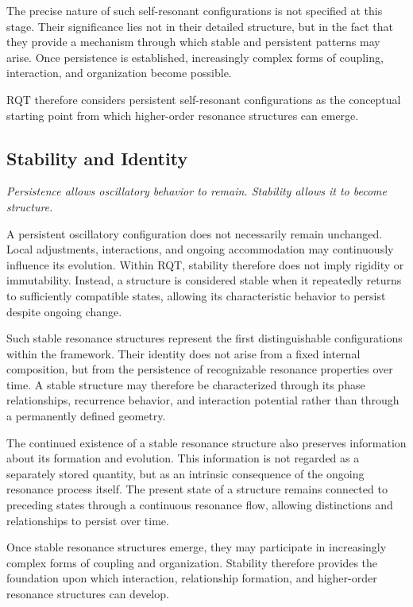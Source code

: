 \documentclass[11pt,a4paper]{article}
\begin{document}
The precise nature of such self-resonant configurations is not specified at this stage. Their significance lies not in their detailed structure, but in the fact that they provide a mechanism through which stable and persistent patterns may arise. Once persistence is established, increasingly complex forms of coupling, interaction, and organization become possible.

RQT therefore considers persistent self-resonant configurations as the conceptual starting point from which higher-order resonance structures can emerge.


\subsection{Stability and Identity}

\emph{Persistence allows oscillatory behavior to remain. Stability allows it to become structure.}

A persistent oscillatory configuration does not necessarily remain unchanged. Local adjustments, interactions, and ongoing accommodation may continuously influence its evolution. Within RQT, stability therefore does not imply rigidity or immutability. Instead, a structure is considered stable when it repeatedly returns to sufficiently compatible states, allowing its characteristic behavior to persist despite ongoing change.

Such stable resonance structures represent the first distinguishable configurations within the framework. Their identity does not arise from a fixed internal composition, but from the persistence of recognizable resonance properties over time. A stable structure may therefore be characterized through its phase relationships, recurrence behavior, and interaction potential rather than through a permanently defined geometry.

The continued existence of a stable resonance structure also preserves information about its formation and evolution. This information is not regarded as a separately stored quantity, but as an intrinsic consequence of the ongoing resonance process itself. The present state of a structure remains connected to preceding states through a continuous resonance flow, allowing distinctions and relationships to persist over time.

Once stable resonance structures emerge, they may participate in increasingly complex forms of coupling and organization. Stability therefore provides the foundation upon which interaction, relationship formation, and higher-order resonance structures can develop.
\end{document}
